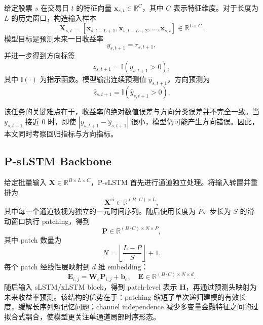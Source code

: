 \documentclass[UTF8,zihao=-4,twocolumn,fontset=fandol]{ctexart}
\begin{document}
给定股票 $s$ 在交易日 $t$ 的特征向量 $\bm{x}_{s,t}\in \mathbb{R}^{C}$，其中 $C$ 表示特征维度。对于长度为 $L$ 的历史窗口，构造输入样本
\begin{equation}
  \bm{X}_{s,t}=\left[\bm{x}_{s,t-L+1},\bm{x}_{s,t-L+2},\ldots,\bm{x}_{s,t}\right]\in\mathbb{R}^{L\times C}.
\end{equation}
模型目标是预测未来一日收益率
\begin{equation}
  y_{s,t+1}=r_{s,t+1},
\end{equation}
并进一步得到方向标签
\begin{equation}
  z_{s,t+1}=\mathbb{I}\left(y_{s,t+1}>0\right),
\end{equation}
其中 $\mathbb{I}(\cdot)$ 为指示函数。模型输出连续预测值 $\hat y_{s,t+1}$，方向预测为
\begin{equation}
  \hat z_{s,t+1}=\mathbb{I}\left(\hat y_{s,t+1}>0\right).
\end{equation}

该任务的关键难点在于，收益率的绝对数值误差与方向分类误差并不完全一致。当 $y_{s,t+1}$ 接近 0 时，即使 $|y_{s,t+1}-\hat y_{s,t+1}|$ 很小，模型仍可能产生方向错误。因此，本文同时考察回归指标与方向指标。

\subsection{P-sLSTM Backbone}

给定批量输入 $\bm{X}\in\mathbb{R}^{B\times L\times C}$，P-sLSTM 首先进行通道独立处理。将输入转置并重排为
\begin{equation}
  \bm{X}^{\mathrm{ci}}\in\mathbb{R}^{(B\cdot C)\times L},
\end{equation}
其中每一个通道被视为独立的一元时间序列。随后使用长度为 $P$、步长为 $S$ 的滑动窗口执行 patching，得到
\begin{equation}
  \bm{P}\in\mathbb{R}^{(B\cdot C)\times N\times P},
\end{equation}
其中 patch 数量为
\begin{equation}
  N=\left\lfloor \frac{L-P}{S}\right\rfloor+1.
\end{equation}
每个 patch 经线性层映射到 $d$ 维 embedding：
\begin{equation}
  \bm{E}_{i,j}=\bm{W}_{e}\bm{P}_{i,j}+\bm{b}_{e},\quad \bm{E}\in\mathbb{R}^{(B\cdot C)\times N\times d}.
\end{equation}
随后输入 sLSTM/xLSTM block，得到 patch-level 表示 $\bm{H}$，再通过预测头映射为未来收益率预测。该结构的优势在于：patching 缩短了单次递归建模的有效长度，缓解长序列短记忆问题；channel independence 减少多变量金融特征之间的过拟合式耦合，使模型更关注单通道局部时序形态。
\end{document}

